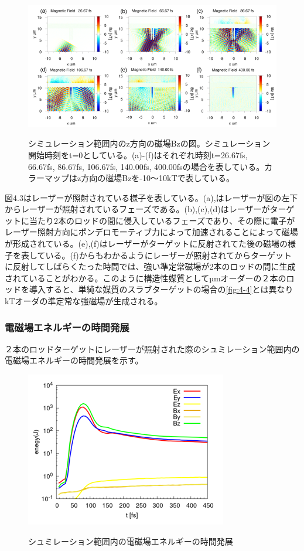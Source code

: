\documentclass[a4paper,11pt,titlepage]{jarticle}
\numberwithin{equation}{section} %
\begin{document}
  \begin{figure}[H]
    \begin{center}
      \includegraphics[scale=0.8]{./image/4-13-2rod_Bz.png}
      \label{fig:4-2-3}
      \caption{シミュレーション範囲内のz方向の磁場Bzの図。シミュレーション開始時刻をt=0としている。(a)-(f)はそれぞれ時刻t=26.67fs, 66.67fs, 86.67fs, 106.67fs, 140.00fs, 400.00fsの場合を表している。カラーマップはz方向の磁場Bzを-10～10kTで表している。}
    \end{center}
  \end{figure}
  図4.3はレーザーが照射されている様子を表している。(a),はレーザーが図の左下からレーザーが照射されているフェーズである。(b),(c),(d)はレーザーがターゲットに当たり2本のロッドの間に侵入しているフェーズであり、その際に電子がレーザー照射方向にポンデロモーティブ力によって加速されることによって磁場が形成されている。(e),(f)はレーザーがターゲットに反射されてた後の磁場の様子を表している。(f)からもわかるようにレーザーが照射されてからターゲットに反射してしばらくたった時間では、強い準定常磁場が2本のロッドの間に生成されていることがわかる。このように構造性媒質としてµmオーダーの２本のロッドを導入すると、単純な媒質のスラブターゲットの場合の\ref*{fig:4-4}とは異なりkTオーダの準定常な強磁場が生成される。

  \subsubsection{電磁場エネルギーの時間発展}
  ２本のロッドターゲットにレーザーが照射された際のシュミレーション範囲内の電磁場エネルギーの時間発展を示す。
  
  \begin{figure}[H]
    \begin{center}
      \includegraphics[scale=1]{./image/4-15-2rod.png}
      \label{fig:4-4-4}
      \caption{シュミレーション範囲内の電磁場エネルギーの時間発展}
    \end{center}
  \end{figure}
  
\end{document}
